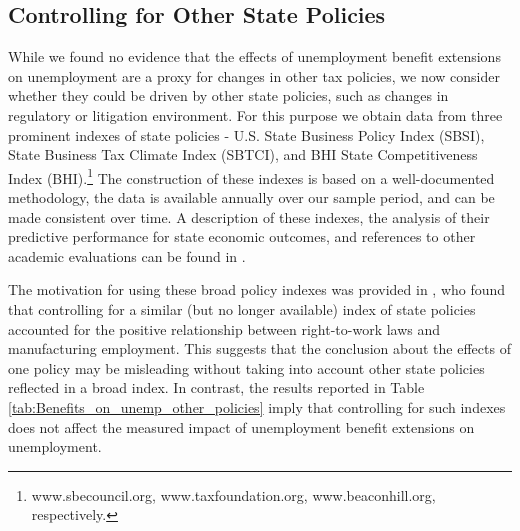 \documentclass[12pt]{article}
\newcommand{\1}{\mathbf{1}}
\begin{document}
\begin{appendix}
\subsection{Controlling for Other State Policies}


While we found no evidence that the effects of unemployment benefit extensions on unemployment are a proxy for changes in other tax policies, we now consider whether they could be driven by other state policies, such as changes in regulatory or litigation environment. For this purpose we obtain data from three prominent indexes of state policies - U.S. State Business Policy Index (SBSI), State Business Tax Climate Index (SBTCI), and BHI State Competitiveness Index (BHI).\footnote{www.sbecouncil.org, www.taxfoundation.org, www.beaconhill.org, respectively.}  The construction of these indexes is based on a well-documented methodology, the data is available annually over our sample period, and can be made consistent over time. A description of these indexes, the analysis of their predictive performance for state economic outcomes, and references to other academic evaluations can be found in \citet{kolko+neumark+mejia:13}.


\begin{table}[t]
\centering
   \caption{Controlling for Other State Policies}\label{tab:Benefits_on_unemp_other_policies}
\small

\vspace{-0.2cm}
\end{table}


%

The motivation for using these broad policy indexes was provided in \citet{holmes:98}, who found that controlling for a similar (but no longer available) index of state policies accounted for the positive relationship between right-to-work laws and manufacturing employment. This suggests that the conclusion about the effects of one policy may be misleading without taking into account other state policies reflected in a broad index. In contrast, the results reported in Table \ref{tab:Benefits_on_unemp_other_policies} imply that controlling for such indexes does not affect the measured impact of unemployment benefit extensions on unemployment.




\end{appendix}
\end{document}
